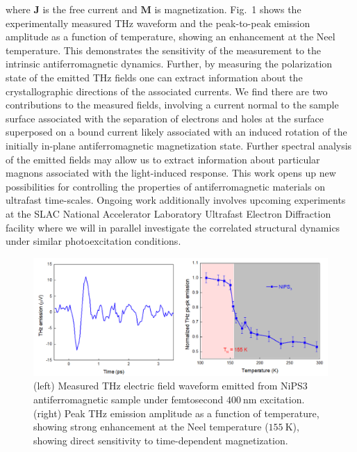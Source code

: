 where \(\mathbf{J}\) is the free current and \(\mathbf{M}\) is magnetization. 
Fig.~1 shows the experimentally measured THz waveform and the peak-to-peak emission amplitude as a function of temperature, showing an enhancement at the Neel temperature.
This demonstrates the sensitivity of the measurement to the intrinsic antiferromagnetic dynamics.
Further, by measuring the polarization state of the emitted THz fields one can extract information about the crystallographic directions of the associated currents.
We find there are two contributions to the measured fields, involving a current normal to the sample surface associated with the separation of electrons and holes at the surface superposed on a bound current likely associated with an induced rotation of the initially in-plane antiferromagnetic magnetization state.
Further spectral analysis of the emitted fields may allow us to extract information about particular magnons associated with the light-induced response.
This work opens up new possibilities for controlling the properties of antiferromagnetic materials on ultrafast time-scales. 
Ongoing work additionally involves upcoming experiments at the SLAC National Accelerator Laboratory Ultrafast Electron Diffraction facility where we will in parallel investigate the correlated structural dynamics under similar photoexcitation conditions.

\begin{figure}[ht]
    \centering\includegraphics[width=1.0\linewidth]{figures/NiPS3}
    \caption{
        (left)  Measured THz electric field waveform emitted from NiPS3 antiferromagnetic sample under femtosecond \(400~\mathrm{nm}\) excitation.
        (right) Peak THz emission amplitude as a function of temperature, showing strong enhancement at the Neel temperature (\(155~\mathrm{K}\)), showing direct sensitivity to time-dependent magnetization.
    }
    \label{fig:NiPS3}
\end{figure}

